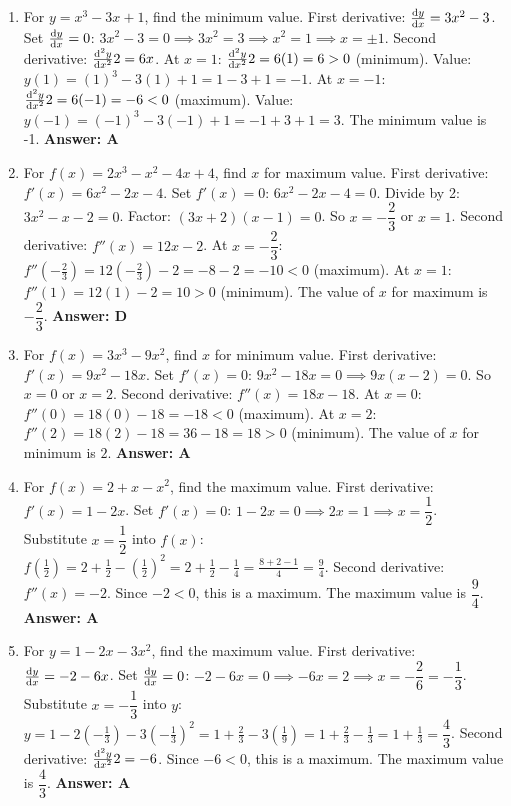 \begin{enumerate}[label={\arabic*.}]
  \item For \(y = x^3 - 3x + 1\), find the minimum value.
    First derivative: \(\frac{\mathrm{d}y}{\mathrm{d}x} = 3x^2 - 3\).
    Set \(\frac{\mathrm{d}y}{\mathrm{d}x} = 0\): \(3x^2 - 3 = 0 \implies 3x^2 = 3 \implies x^2 = 1 \implies x = \pm 1\).
    Second derivative: \(\frac{\mathrm{d}^2 y}{\mathrm{d} x^2}{2} = 6x\).
    At \(x=1\): \(\frac{\mathrm{d}^2 y}{\mathrm{d} x^2}{2} = 6(1) = 6 > 0\) (minimum). Value: \(y(1) = (1)^3 - 3(1) + 1 = 1 - 3 + 1 = -1\).
    At \(x=-1\): \(\frac{\mathrm{d}^2 y}{\mathrm{d} x^2}{2} = 6(-1) = -6 < 0\) (maximum). Value: \(y(-1) = (-1)^3 - 3(-1) + 1 = -1 + 3 + 1 = 3\).
    The minimum value is -1.
    \textbf{Answer: A}

  \item For \(f(x) = 2x^3 - x^2 - 4x + 4\), find \(x\) for maximum value.
    First derivative: \(f'(x) = 6x^2 - 2x - 4\).
    Set \(f'(x) = 0\): \(6x^2 - 2x - 4 = 0\). Divide by 2: \(3x^2 - x - 2 = 0\).
    Factor: \((3x+2)(x-1) = 0\). So \(x = -\dfrac{2}{3}\) or \(x = 1\).
    Second derivative: \(f''(x) = 12x - 2\).
    At \(x = -\dfrac{2}{3}\): \(f''(-\frac{2}{3}) = 12(-\frac{2}{3}) - 2 = -8 - 2 = -10 < 0\) (maximum).
    At \(x = 1\): \(f''(1) = 12(1) - 2 = 10 > 0\) (minimum).
    The value of \(x\) for maximum is \(-\dfrac{2}{3}\).
    \textbf{Answer: D}

  \item For \(f(x) = 3x^3 - 9x^2\), find \(x\) for minimum value.
    First derivative: \(f'(x) = 9x^2 - 18x\).
    Set \(f'(x) = 0\): \(9x^2 - 18x = 0 \implies 9x(x - 2) = 0\).
    So \(x=0\) or \(x=2\).
    Second derivative: \(f''(x) = 18x - 18\).
    At \(x=0\): \(f''(0) = 18(0) - 18 = -18 < 0\) (maximum).
    At \(x=2\): \(f''(2) = 18(2) - 18 = 36 - 18 = 18 > 0\) (minimum).
    The value of \(x\) for minimum is \(2\).
    \textbf{Answer: A}

  \item For \(f(x) = 2 + x - x^2\), find the maximum value.
    First derivative: \(f'(x) = 1 - 2x\).
    Set \(f'(x) = 0\): \(1 - 2x = 0 \implies 2x = 1 \implies x = \dfrac{1}{2}\).
    Substitute \(x=\dfrac{1}{2}\) into \(f(x)\): \(f(\frac{1}{2}) = 2 + \frac{1}{2} - (\frac{1}{2})^2 = 2 + \frac{1}{2} - \frac{1}{4} = \frac{8+2-1}{4} = \frac{9}{4}\).
    Second derivative: \(f''(x) = -2\). Since \(-2 < 0\), this is a maximum. The maximum value is \(\dfrac{9}{4}\).
    \textbf{Answer: A}

  \item For \(y = 1 - 2x - 3x^2\), find the maximum value.
    First derivative: \(\frac{\mathrm{d}y}{\mathrm{d}x} = -2 - 6x\).
    Set \(\frac{\mathrm{d}y}{\mathrm{d}x} = 0\): \(-2 - 6x = 0 \implies -6x = 2 \implies x = -\dfrac{2}{6} = -\dfrac{1}{3}\).
    Substitute \(x=-\dfrac{1}{3}\) into \(y\): \(y = 1 - 2(-\frac{1}{3}) - 3(-\frac{1}{3})^2 = 1 + \frac{2}{3} - 3(\frac{1}{9}) = 1 + \frac{2}{3} - \frac{1}{3} = 1 + \frac{1}{3} = \dfrac{4}{3}\).
    Second derivative: \(\frac{\mathrm{d}^2 y}{\mathrm{d} x^2}{2} = -6\). Since \(-6 < 0\), this is a maximum. The maximum value is \(\dfrac{4}{3}\).
    \textbf{Answer: A}


\end{enumerate}
